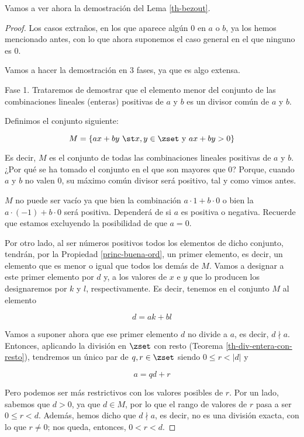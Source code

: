 Vamos a ver ahora la demostración del Lema \ref{th-bezout}.

\begin{proof}
  Los casos extraños, en los que aparece algún 0 en $a$ o $b$, ya los hemos
  mencionado antes, con lo que ahora suponemos el caso general en el que
  ninguno es 0.

  Vamos a hacer la demostración en 3 fases, ya que es algo extensa.

  Fase 1. Trataremos de demostrar que el elemento menor del conjunto de las
  combinaciones lineales (enteras) positivas de $a$ y $b$ es un divisor
  común de $a$ y $b$.

  Definimos el conjunto siguiente:

  $$ M = \{ax + by \ \st x, y \in \zset \ \text{y} \ ax + by > 0 \} $$

  \noindent Es decir, $M$ es el conjunto de todas las combinaciones lineales
  positivas de $a$ y $b$. ¿Por qué se ha tomado el conjunto en el que son
  mayores que 0? Porque, cuando $a$ y $b$ no valen 0, su máximo común
  divisor será positivo, tal y como vimos antes.

  $M$ no puede ser vacío ya que bien la combinación $a \cdot 1 + b \cdot 0$
  o bien la $a \cdot ({-1}) + b \cdot 0$ será positiva. Dependerá de si $a$
  es positiva o negativa. Recuerde que estamos excluyendo la posibilidad de
  que $a = 0$.

  Por otro lado, al ser números positivos todos los elementos de dicho
  conjunto, tendrán, por la Propiedad \ref{princ-buena-ord}, un primer
  elemento, es decir, un elemento que es menor o igual que todos los demás
  de $M$. Vamos a designar a este primer elemento por $d$ y, a los valores
  de $x$ e $y$ que lo producen los designaremos por $k$ y $l$,
  respectivamente. Es decir, tenemos en el conjunto $M$ al elemento

  $$ d = ak + bl $$

  Vamos a suponer ahora que ese primer elemento $d$ no divide a $a$, es
  decir, $d \nmid a$. Entonces, aplicando la división en $\zset$ con resto
  (Teorema \ref{th-div-entera-con-resto}), tendremos un único par de $q, r
  \in \zset$ siendo $0 \leq r < |d|$ y

  $$ a = qd + r $$

  \noindent Pero podemos ser más restrictivos con los valores posibles de
  $r$. Por un lado, sabemos que $d > 0$, ya que $d \in M$, por lo que el
  rango de valores de $r$ pasa a ser $0 \leq r < d$. Además, hemos dicho que
  $d \nmid a$, es decir, no es una división exacta, con lo que $r \neq 0$;
  nos queda, entonces, $0 < r < d$.


\end{proof}
